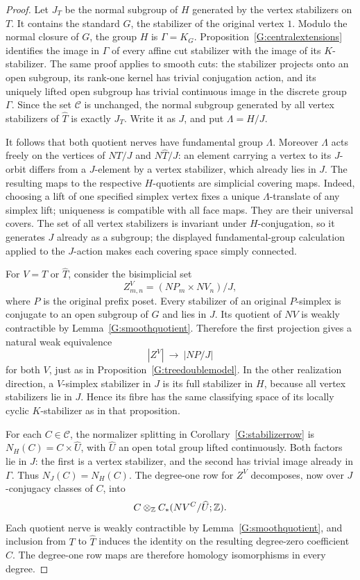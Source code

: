 \begin{proof}
Let $J_T$ be the normal subgroup of $H$ generated by the
vertex stabilizers on $T$. It contains the standard $G$, the
stabilizer of the original vertex $1$. Modulo the normal
closure of $G$, the group $H$ is $\Gamma=K_G$.
Proposition~\ref{G:centralextensions} identifies the image
in $\Gamma$ of every affine cut stabilizer with the image of
its $K$-stabilizer. The same proof applies to smooth cuts:
the stabilizer projects onto an open subgroup, its rank-one
kernel has trivial conjugation action, and its uniquely lifted
open subgroup has trivial continuous image in the discrete
group $\Gamma$. Since the set $\mathscr C$ is unchanged, the
normal subgroup generated by all vertex stabilizers of
$\widehat T$ is exactly $J_T$. Write it as $J$, and put
$\Lambda=H/J$.

It follows that both quotient nerves have fundamental group
$\Lambda$. Moreover $\Lambda$ acts freely on the vertices
of $NT/J$ and $N\widehat T/J$: an element carrying a vertex
to its $J$-orbit differs from a $J$-element by a vertex
stabilizer, which already lies in $J$. The resulting maps to
the respective $H$-quotients are simplicial covering maps.
Indeed, choosing a lift of one specified simplex vertex fixes
a unique $\Lambda$-translate of any simplex lift; uniqueness
is compatible with all face maps. They are their universal
covers. The set of all vertex
stabilizers is invariant under $H$-conjugation, so it generates
$J$ already as a subgroup; the displayed fundamental-group
calculation applied to the $J$-action makes each covering
space simply connected.

For $V=T$ or $\widehat T$, consider the bisimplicial set
\[
 Z^V_{m,n}=(NP_m\times NV_n)/J,
\]
where $P$ is the original prefix poset. Every stabilizer of
an original $P$-simplex is conjugate to an open subgroup of
$G$ and lies in $J$. Its quotient of $NV$ is weakly
contractible by Lemma~\ref{G:smoothquotient}. Therefore the
first projection gives a natural weak equivalence
\[
 |Z^V|\ \longrightarrow\ |NP/J|
\]
for both $V$, just as in Proposition~\ref{G:treedoublemodel}.
In the other realization direction, a $V$-simplex stabilizer
in $J$ is its full stabilizer in $H$, because all vertex
stabilizers lie in $J$. Hence its fibre has the same
classifying space of its locally cyclic $K$-stabilizer as in
that proposition.

For each $C\in\mathscr C$, the normalizer splitting in
Corollary~\ref{G:stabilizerrow} is
$N_H(C)=C\times\widehat U$, with $\widehat U$ an open total
group lifted continuously. Both factors lie in $J$: the
first is a vertex stabilizer, and the second has trivial
image already in $\Gamma$. Thus $N_J(C)=N_H(C)$. The
degree-one row for $Z^V$ decomposes, now over
$J$-conjugacy classes of $C$, into
\[
 C\otimes_{\mathbb Z} C_*(NV^C/\widehat U;\mathbb Z).
\]
Each quotient nerve is weakly contractible by
Lemma~\ref{G:smoothquotient}, and inclusion from $T$ to
$\widehat T$ induces the identity on the resulting
degree-zero coefficient $C$. The degree-one row maps are
therefore homology isomorphisms in every degree.


\end{proof}
